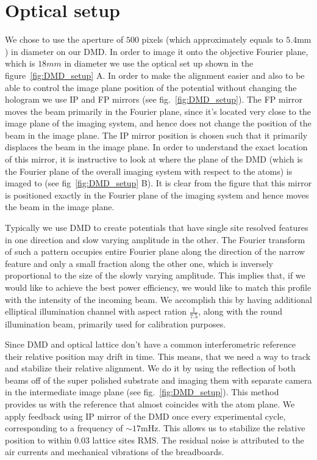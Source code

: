 \section{Optical setup}
We chose to use the aperture of $500$ pixels (which approximately equals to $5.4 \mathrm{mm}$) in diameter on our DMD. In order to image it onto the objective Fourier plane, which is $18 mm$ in diameter we use the optical set up shown in the figure~\ref{fig:DMD_setup} A. In order to make the alignment easier and also to be able to control the image plane position of the potential without changing the hologram we use IP and FP mirrors (see fig.~\ref{fig:DMD_setup}). The FP mirror moves the beam primarily in the Fourier plane, since it's located very close to the image plane of the imaging system, and hence does not change the position of the beam in the image plane. The IP mirror position is chosen such that it primarily displaces the beam in the image plane. In order to understand the exact location of this mirror, it is instructive to look at where the plane of the DMD (which is the Fourier plane of the overall imaging system with respect to the atoms) is imaged to (see fig~\ref{fig:DMD_setup} B). It is clear from the figure that this mirror is positioned exactly in the Fourier plane of the imaging system and hence moves the beam in the image plane.

Typically we use DMD to create potentials that have single site resolved features in one direction and slow varying amplitude in the other. The Fourier transform of such a pattern occupies entire Fourier plane along the direction of the narrow feature and only a small fraction along the other one, which is inversely proportional to the size of the slowly varying amplitude. This implies that, if we would like to achieve the best power efficiency, we would like to match this profile with the intensity of the incoming beam. We accomplish this by having additional elliptical illumination channel with aspect ration $\frac{1}{7.5}$, along with the round illumination beam, primarily used for calibration purposes.

Since DMD and optical lattice don't have a common interferometric reference their relative position may drift in time. This means, that we need a way to track and stabilize their relative alignment. We do it by using the reflection of both beams off of the super polished substrate and imaging them with separate camera in the intermediate image plane (see fig.~\ref{fig:DMD_setup}). This method provides us with the reference that almost coincides with the atom plane. We apply feedback using IP mirror of the DMD once every experimental cycle, corresponding to a frequency of $\sim 17 \mathrm{mHz}$. This allows us to stabilize the relative position to within $0.03$ lattice sites RMS. The residual noise is attributed to the air currents and mechanical vibrations of the breadboards.

